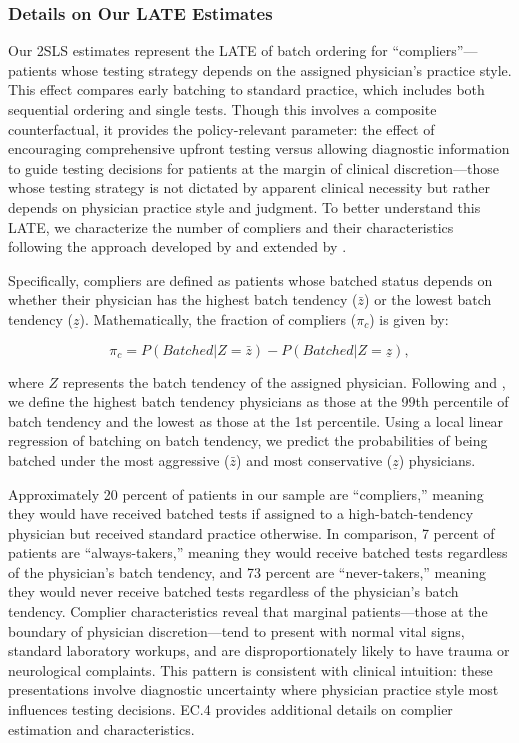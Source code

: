 \documentclass[,,blindrev]{informs}
\begin{document}
\subsubsection{Details on Our LATE Estimates}\label{sec:late}

Our 2SLS estimates represent the LATE of batch ordering for
``compliers''---patients whose testing strategy depends on the assigned
physician's practice style. This effect compares early batching to
standard practice, which includes both sequential ordering and single
tests. Though this involves a composite counterfactual, it provides the
policy-relevant parameter: the effect of encouraging comprehensive
upfront testing versus allowing diagnostic information to guide testing
decisions for patients at the margin of clinical discretion---those
whose testing strategy is not dictated by apparent clinical necessity
but rather depends on physician practice style and judgment. To better
understand this LATE, we characterize the number of compliers and their
characteristics following the approach developed by
\citet{abadie2003economic} and extended by \citet{Dahl2014}.

Specifically, compliers are defined as patients whose batched status
depends on whether their physician has the highest batch tendency
(\(\bar{z}\)) or the lowest batch tendency (\(\underline{z}\)).
Mathematically, the fraction of compliers (\(\pi_c\)) is given by:

\[
\pi_c = P(Batched | Z = \bar{z}) - P(Batched | Z = \underline{z}),
\]

where \(Z\) represents the batch tendency of the assigned physician.
Following \citet{Dahl2014} and \citet{dobbie2018effects}, we define the
highest batch tendency physicians as those at the 99th percentile of
batch tendency and the lowest as those at the 1st percentile. Using a
local linear regression of batching on batch tendency, we predict the
probabilities of being batched under the most aggressive (\(\bar{z}\))
and most conservative (\(\underline{z}\)) physicians.

Approximately 20 percent of patients in our sample are ``compliers,''
meaning they would have received batched tests if assigned to a
high-batch-tendency physician but received standard practice otherwise.
In comparison, 7 percent of patients are ``always-takers,'' meaning they
would receive batched tests regardless of the physician's batch
tendency, and 73 percent are ``never-takers,'' meaning they would never
receive batched tests regardless of the physician's batch tendency.
Complier characteristics reveal that marginal patients---those at the
boundary of physician discretion---tend to present with normal vital
signs, standard laboratory workups, and are disproportionately likely to
have trauma or neurological complaints. This pattern is consistent with
clinical intuition: these presentations involve diagnostic uncertainty
where physician practice style most influences testing decisions. EC.4
provides additional details on complier estimation and characteristics.
\end{document}
